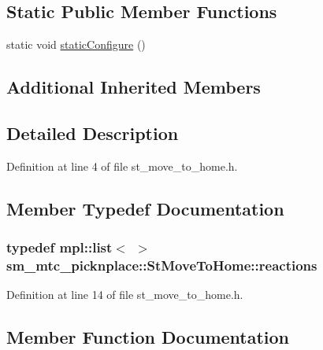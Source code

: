 \subsection*{Static Public Member Functions}
\begin{DoxyCompactItemize}
\item 
static void \hyperlink{structsm__mtc__picknplace_1_1StMoveToHome_aeb7869c1a02be587f252a1dad72f0f39}{static\+Configure} ()
\end{DoxyCompactItemize}
\subsection*{Additional Inherited Members}


\subsection{Detailed Description}


Definition at line 4 of file st\+\_\+move\+\_\+to\+\_\+home.\+h.



\subsection{Member Typedef Documentation}
\subsubsection[{\texorpdfstring{reactions}{reactions}}]{\setlength{\rightskip}{0pt plus 5cm}typedef mpl\+::list$<$ $>$ {\bf sm\+\_\+mtc\+\_\+picknplace\+::\+St\+Move\+To\+Home\+::reactions}}\hypertarget{structsm__mtc__picknplace_1_1StMoveToHome_ace089f0b355f84823c308e0e7d79ea16}{}\label{structsm__mtc__picknplace_1_1StMoveToHome_ace089f0b355f84823c308e0e7d79ea16}


Definition at line 14 of file st\+\_\+move\+\_\+to\+\_\+home.\+h.



\subsection{Member Function Documentation}

